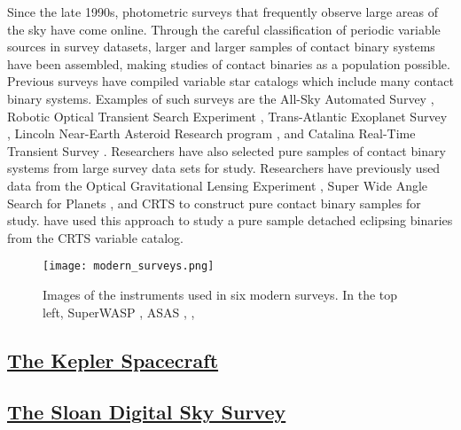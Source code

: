 \documentclass[12pt]{article} %
\numberwithin{equation}{section} %
\begin{document}
Since the late 1990s, photometric surveys that frequently observe large areas of the sky have come online. Through the careful classification of periodic variable sources in survey datasets, larger and larger samples of contact binary systems have been assembled, making studies of contact binaries as a population possible. Previous surveys have compiled variable star catalogs which include many contact binary systems. Examples of such surveys are the All-Sky Automated Survey \citep[ASAS,][]{pojmanski2000all}, Robotic Optical Transient Search Experiment \citep[ROTSE,][]{akerlof2000rotse}, Trans-Atlantic Exoplanet Survey \citep[TrES,][]{devor2008identification}, Lincoln Near-Earth Asteroid Research program \citep[LINEAR,][]{palaversa2013exploring}, and Catalina Real-Time Transient Survey \citep[CRTS,][]{drake2014catalina}. Researchers have also selected pure samples of contact binary systems from large survey data sets for study. Researchers have previously used data from the Optical Gravitational Lensing Experiment \citep[OGLE,][]{rucinski1996eclipsing}, Super Wide Angle Search for Planets \citep[SuperWASP,][]{norton2011short}, and CRTS \citep{drake2014ultra} to construct pure contact binary samples for study. \citet{lee2015properties} have used this approach to study a pure sample detached eclipsing binaries from the CRTS variable catalog. 

\begin{figure}[H]
\centering
\texttt{[image: modern\_surveys.png]}
\caption{Images of the instruments used in six modern surveys. In the top left, SuperWASP \citep[SuperWASP,][]{norton2011short}, ASAS \citep[ASAS,][]{pojmanski2000all}, \citep[ROTSE,][]{akerlof2000rotse},  }
\label{fig: modern_surveys}
\end{figure}


\subsection[The Kepler Spacecraft]{\hyperlink{toc}{The Kepler Spacecraft}}

\subsection[The Sloan Digital Sky Survey]{\hyperlink{toc}{The Sloan Digital Sky Survey}}

\cite{york2000sloan}

\citep{ivezic2007sloan} 
\end{document}
